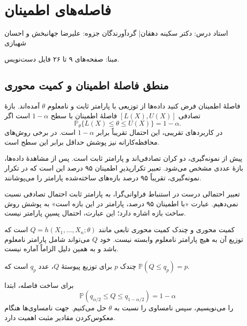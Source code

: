 \documentclass[12pt,a4paper,oneside]{report}
\newcommand{\source}[1]{\par{\small\color{muted} مبنا: صفحه‌های #1 فایل دست‌نویس.}\par}
\newcommand{\Prob}{\mathbb P}
\begin{document}
\setcounter{chapter}{2}
\chapter{فاصله‌های اطمینان}
\begin{center}{\small\color{muted} استاد درس: دکتر سکینه دهقان\quad | \quad گردآورندگان جزوه: علیرضا جهانبخش و احسان شهبازی}\end{center}

\source{۹ تا ۲۶}
\section{منطق فاصلهٔ اطمینان و کمیت محوری}
\begin{definition}{فاصلهٔ اطمینان}
فرض کنید داده‌ها از توزیعی با پارامتر ثابت و نامعلوم $\theta$ آمده‌اند. بازهٔ تصادفی $[L(X),U(X)]$ فاصلهٔ اطمینان با سطح $1-\alpha$ است اگر
\[\Prob_\theta\{L(X)\le\theta\le U(X)\}=1-\alpha.\]
در کاربردهای تقریبی، این احتمال تقریباً برابر $1-\alpha$ است. در برخی روش‌های محافظه‌کارانه نیز پوشش حداقل برابر این سطح است.
\end{definition}
پیش از نمونه‌گیری، دو کران تصادفی‌اند و پارامتر ثابت است. پس از مشاهدهٔ داده‌ها، بازهٔ عددی مشخص می‌شود. تعبیر تکرارپذیرِ اطمینان ۹۵ درصد این است که در تکرار نمونه‌گیری، تقریباً ۹۵ درصد بازه‌های ساخته‌شده پارامتر را می‌پوشانند.
\begin{important}{تعبیر احتمالی درست}
در استنباط فراوانی‌گرا، به پارامتر ثابت احتمال تصادفی نسبت نمی‌دهیم. عبارت «با اطمینان ۹۵ درصد، پارامتر در این بازه است» به پوشش روش ساخت بازه اشاره دارد؛ این عبارت، احتمال پسینِ پارامتر نیست.
\end{important}
\begin{definition}{کمیت محوری و چندک}
کمیت محوری تابعی مانند $Q=h(X_1,\ldots,X_n;\theta)$ است که توزیع آن به هیچ پارامتر نامعلوم وابسته نیست. خود $Q$ می‌تواند شامل پارامتر نامعلوم باشد و به همین دلیل الزاماً آماره نیست.

چندک $p$ برای توزیع پیوستهٔ $Q$، عدد $q_p$ است که $\Prob(Q\le q_p)=p$.
\end{definition}
برای ساخت فاصله، ابتدا
\[\Prob(q_{\alpha/2}\le Q\le q_{1-\alpha/2})=1-\alpha\]
را می‌نویسیم، سپس نامساوی را نسبت به $\theta$ حل می‌کنیم. جهت نامساوی‌ها هنگام معکوس‌کردن مقادیر مثبت اهمیت دارد.
\end{document}
